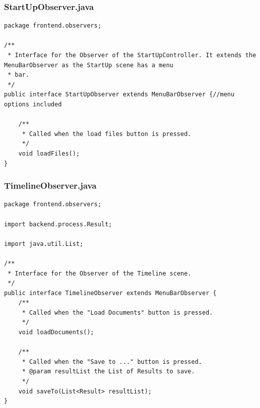 \subsubsection{StartUpObserver.java}
\begin{lstlisting}
package frontend.observers;

/**
 * Interface for the Observer of the StartUpController. It extends the MenuBarObserver as the StartUp scene has a menu
 * bar.
 */
public interface StartUpObserver extends MenuBarObserver {//menu options included

    /**
     * Called when the load files button is pressed.
     */
    void loadFiles();
}
\end{lstlisting}
\subsubsection{TimelineObserver.java}
\begin{lstlisting}
package frontend.observers;

import backend.process.Result;

import java.util.List;

/**
 * Interface for the Observer of the Timeline scene.
 */
public interface TimelineObserver extends MenuBarObserver {
    /**
     * Called when the "Load Documents" button is pressed.
     */
    void loadDocuments();

    /**
     * Called when the "Save to ..." button is pressed.
     * @param resultList the List of Results to save.
     */
    void saveTo(List<Result> resultList);
}
\end{lstlisting}
